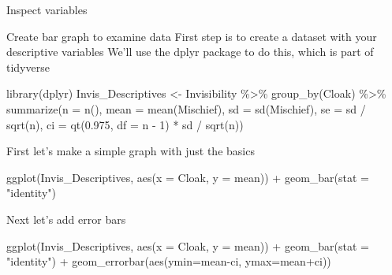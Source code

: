 \documentclass[
]{book}
\newenvironment{Shaded}{\begin{snugshade}}{\end{snugshade}}
\newcommand{\AttributeTok}[1]{\textcolor[rgb]{0.77,0.63,0.00}{#1}}
\newcommand{\DecValTok}[1]{\textcolor[rgb]{0.00,0.00,0.81}{#1}}
\newcommand{\FloatTok}[1]{\textcolor[rgb]{0.00,0.00,0.81}{#1}}
\newcommand{\FunctionTok}[1]{\textcolor[rgb]{0.00,0.00,0.00}{#1}}
\newcommand{\NormalTok}[1]{#1}
\newcommand{\OtherTok}[1]{\textcolor[rgb]{0.56,0.35,0.01}{#1}}
\newcommand{\SpecialCharTok}[1]{\textcolor[rgb]{0.00,0.00,0.00}{#1}}
\newcommand{\StringTok}[1]{\textcolor[rgb]{0.31,0.60,0.02}{#1}}
\begin{document}
Inspect variables

\begin{Shaded}
\end{Shaded}

Create bar graph to examine data
First step is to create a dataset with your descriptive variables
We'll use the dplyr package to do this, which is part of tidyverse

\begin{Shaded}
\begin{Highlighting}[]
\FunctionTok{library}\NormalTok{(dplyr)}
\NormalTok{Invis\_Descriptives }\OtherTok{\textless{}{-}}\NormalTok{ Invisibility }\SpecialCharTok{\%\textgreater{}\%}
  \FunctionTok{group\_by}\NormalTok{(Cloak) }\SpecialCharTok{\%\textgreater{}\%}
  \FunctionTok{summarize}\NormalTok{(}\AttributeTok{n =} \FunctionTok{n}\NormalTok{(),}
            \AttributeTok{mean =} \FunctionTok{mean}\NormalTok{(Mischief),}
            \AttributeTok{sd =} \FunctionTok{sd}\NormalTok{(Mischief),}
            \AttributeTok{se =}\NormalTok{ sd }\SpecialCharTok{/} \FunctionTok{sqrt}\NormalTok{(n),}
            \AttributeTok{ci =} \FunctionTok{qt}\NormalTok{(}\FloatTok{0.975}\NormalTok{, }\AttributeTok{df =}\NormalTok{ n }\SpecialCharTok{{-}} \DecValTok{1}\NormalTok{) }\SpecialCharTok{*}\NormalTok{ sd }\SpecialCharTok{/} \FunctionTok{sqrt}\NormalTok{(n))}
\end{Highlighting}
\end{Shaded}

First let's make a simple graph with just the basics

\begin{Shaded}
\begin{Highlighting}[]
\FunctionTok{ggplot}\NormalTok{(Invis\_Descriptives, }
       \FunctionTok{aes}\NormalTok{(}\AttributeTok{x =}\NormalTok{ Cloak, }
           \AttributeTok{y =}\NormalTok{ mean)) }\SpecialCharTok{+}
  \FunctionTok{geom\_bar}\NormalTok{(}\AttributeTok{stat =} \StringTok{"identity"}\NormalTok{)}
\end{Highlighting}
\end{Shaded}

Next let's add error bars

\begin{Shaded}
\begin{Highlighting}[]
\FunctionTok{ggplot}\NormalTok{(Invis\_Descriptives, }
       \FunctionTok{aes}\NormalTok{(}\AttributeTok{x =}\NormalTok{ Cloak, }
           \AttributeTok{y =}\NormalTok{ mean)) }\SpecialCharTok{+}
  \FunctionTok{geom\_bar}\NormalTok{(}\AttributeTok{stat =} \StringTok{"identity"}\NormalTok{) }\SpecialCharTok{+}
  \FunctionTok{geom\_errorbar}\NormalTok{(}\FunctionTok{aes}\NormalTok{(}\AttributeTok{ymin=}\NormalTok{mean}\SpecialCharTok{{-}}\NormalTok{ci,}
                    \AttributeTok{ymax=}\NormalTok{mean}\SpecialCharTok{+}\NormalTok{ci))}
\end{Highlighting}
\end{Shaded}
\end{document}
